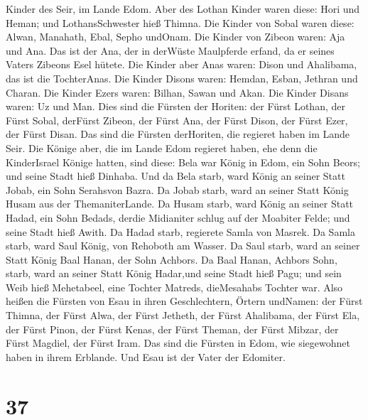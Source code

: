 Kinder des Seir, im Lande Edom.  Aber des Lothan Kinder
waren diese: Hori und Heman; und LothansSchwester hieß Thimna.
 Die Kinder von Sobal waren diese: Alwan, Manahath, Ebal,
Sepho undOnam.  Die Kinder von Zibeon waren: Aja und Ana.
Das ist der Ana, der in derWüste Maulpferde erfand, da er seines Vaters
Zibeons Esel hütete.  Die Kinder aber Anas waren: Dison und
Ahalibama, das ist die TochterAnas.  Die Kinder Disons
waren: Hemdan, Esban, Jethran und Charan.  Die Kinder Ezers
waren: Bilhan, Sawan und Akan.  Die Kinder Disans waren: Uz
und Man.  Dies sind die Fürsten der Horiten: der Fürst
Lothan, der Fürst Sobal, derFürst Zibeon, der Fürst Ana, 
der Fürst Dison, der Fürst Ezer, der Fürst Disan. Das sind die Fürsten
derHoriten, die regieret haben im Lande Seir.  Die Könige
aber, die im Lande Edom regieret haben, ehe denn die KinderIsrael Könige
hatten, sind diese:  Bela war König in Edom, ein Sohn
Beors; und seine Stadt hieß Dinhaba.  Und da Bela starb,
ward König an seiner Statt Jobab, ein Sohn Serahsvon Bazra.
 Da Jobab starb, ward an seiner Statt König Husam aus der
ThemaniterLande.  Da Husam starb, ward König an seiner
Statt Hadad, ein Sohn Bedads, derdie Midianiter schlug auf der Moabiter
Felde; und seine Stadt hieß Awith.  Da Hadad starb,
regierete Samla von Masrek.  Da Samla starb, ward Saul
König, von Rehoboth am Wasser.  Da Saul starb, ward an
seiner Statt König Baal Hanan, der Sohn Achbors.  Da Baal
Hanan, Achbors Sohn, starb, ward an seiner Statt König Hadar,und seine
Stadt hieß Pagu; und sein Weib hieß Mehetabeel, eine Tochter Matreds,
dieMesahabs Tochter war.  Also heißen die Fürsten von Esau
in ihren Geschlechtern, Örtern undNamen: der Fürst Thimna, der Fürst
Alwa, der Fürst Jetheth,  der Fürst Ahalibama, der Fürst
Ela, der Fürst Pinon,  der Fürst Kenas, der Fürst Theman,
der Fürst Mibzar,  der Fürst Magdiel, der Fürst Iram. Das
sind die Fürsten in Edom, wie siegewohnet haben in ihrem Erblande. Und
Esau ist der Vater der Edomiter.

\hypertarget{section-36}{%
\section{37}\label{section-36}}

